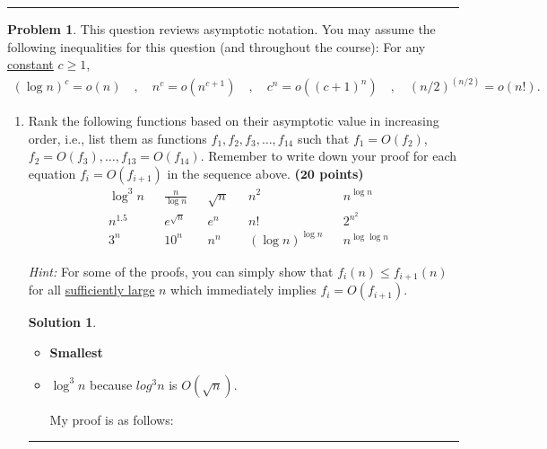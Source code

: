 \documentclass{article}
\theoremstyle{definition}
\newtheorem{problem}{Problem}
\def\fline{\rule{0.75\linewidth}{0.5pt}}
\newcommand{\finishline}{
  \begin{center}\fline
\end{center}}
\newtheorem*{solution*}{Solution}
\newenvironment{solution}{
\begin{solution*}}{{\finishline}
\end{solution*}}
\newcommand{\grade}[1]{\hfill{\textbf{($\mathbf{#1}$ points)}}}
\begin{document}
\finishline
\newpage

\newpage

\bigskip

\begin{problem}
  This question reviews asymptotic notation. You may assume the following inequalities for this question (and throughout the course): For any \underline{constant} $c \geq 1$,
  \begin{align*}
    (\log{n})^c = o(n) \quad,\quad n^c = o(n^{c+1}) \quad,\quad c^n = o((c+1)^n) \quad,\quad (n/2)^{(n/2)} = o(n!).
  \end{align*}
  \begin{enumerate}
    \item[(a)] Rank the following functions based on their asymptotic value in increasing order, i.e., list them as functions $f_1,f_2,f_3,\ldots,f_{14}$ such that $f_1 = O(f_2)$, $f_2 = O(f_3), \ldots, f_{13} = O(f_{14})$. Remember to write down your proof
      for each equation $f_i = O(f_{i+1})$ in the sequence above.  \grade{20}
      \begin{align*}
        &\log^3 n &&\frac{n}{\log n} &&\sqrt{n}  &&n^2  &&n^{\log n} \\
        &n^{1.5} &&e^{\sqrt{n}} &&e^n &&n!  &&2^{n^2} \\
        &3^n && 10^{n} &&n^n &&(\log n)^{\log n} &&n^{\log \log n}
      \end{align*}

      \smallskip
      \emph{Hint:} For some of the proofs, you can simply show that $f_i(n) \leq f_{i+1}(n)$ for all \underline{sufficiently large} $n$ which immediately implies $f_i = O(f_{i+1})$.


      \begin{solution}
        \
        \begin{itemize}
          \item \textbf{Smallest}
          \item $\log^3 n$ because $log^3 n$ is $O(\sqrt{n}).$

            My proof is as follows:
            \


\end{itemize}
\end{solution}
\end{enumerate}
\end{problem}
\end{document}
